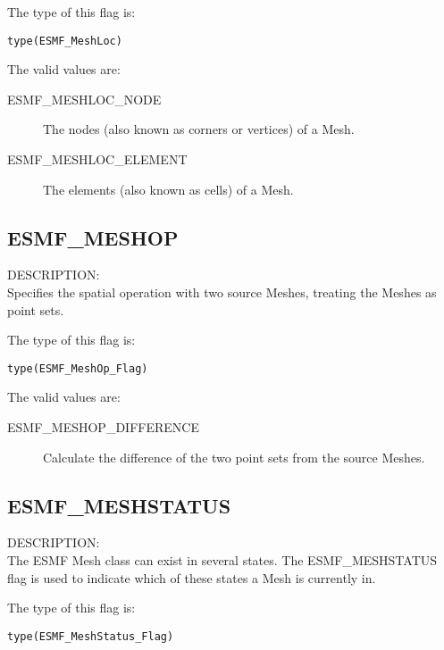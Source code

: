 The type of this flag is:

{\tt type(ESMF\_MeshLoc)}

The valid values are:
\begin{description}

\item [ESMF\_MESHLOC\_NODE]
         The nodes (also known as corners or vertices) of a Mesh. 

\item [ESMF\_MESHLOC\_ELEMENT]
         The elements (also known as cells) of a Mesh. 
\end{description}


\subsection{ESMF\_MESHOP}
\label{const:meshop}
{\sf DESCRIPTION:\\}  
 Specifies the spatial operation with two source Meshes, treating the Meshes as point sets.

The type of this flag is:

{\tt type(ESMF\_MeshOp\_Flag)}

The valid values are:
\begin{description}

\item [ESMF\_MESHOP\_DIFFERENCE]
         Calculate the difference of the two point sets from the source Meshes.
\end{description}

\subsection{ESMF\_MESHSTATUS}
\label{const:meshstatus}

{\sf DESCRIPTION:\\}
The ESMF Mesh class can exist in several states. The ESMF\_MESHSTATUS 
flag is used to indicate which of these states a Mesh is currently in. 

The type of this flag is:

{\tt type(ESMF\_MeshStatus\_Flag)}


